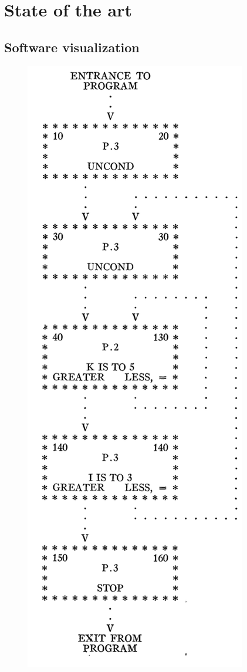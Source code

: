 
\chapter[Related Works]{State of the art}
\graphicspath{ {images/stateOfArt} }



\section{Software visualization}


\begin{figure}

  \includegraphics[width=0.9\linewidth]{Haibt1959_Flowchart.png} 

\end{figure}
